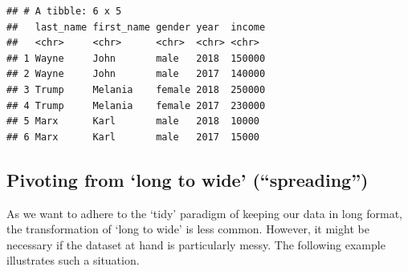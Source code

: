 \documentclass[
  12pt,
]{style/krantz}
\begin{document}
\begin{verbatim}
## # A tibble: 6 x 5
##   last_name first_name gender year  income
##   <chr>     <chr>      <chr>  <chr> <chr> 
## 1 Wayne     John       male   2018  150000
## 2 Wayne     John       male   2017  140000
## 3 Trump     Melania    female 2018  250000
## 4 Trump     Melania    female 2017  230000
## 5 Marx      Karl       male   2018  10000 
## 6 Marx      Karl       male   2017  15000
\end{verbatim}

\hypertarget{pivoting-from-long-to-wide-spreading}{%
\subsection{Pivoting from `long to wide' (``spreading'')}\label{pivoting-from-long-to-wide-spreading}}

As we want to adhere to the `tidy' paradigm of keeping our data in long format, the transformation of `long to wide' is less common. However, it might be necessary if the dataset at hand is particularly messy. The following example illustrates such a situation.
\end{document}
